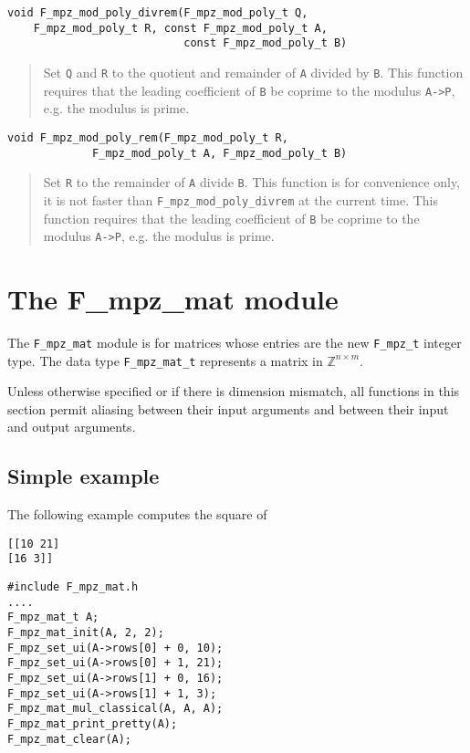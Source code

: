\documentclass[a4paper,10pt]{article}
\newcommand{\Z}{\mathbb{Z}}
\newcommand{\code}{\lstinline}
\begin{document}
\begin{lstlisting}
void F_mpz_mod_poly_divrem(F_mpz_mod_poly_t Q, 
    F_mpz_mod_poly_t R, const F_mpz_mod_poly_t A, 
                           const F_mpz_mod_poly_t B)
\end{lstlisting}
\begin{quote}
Set \code{Q} and \code{R} to the quotient and remainder of \code{A} divided by \code{B}. This function 
requires that the leading coefficient of \code{B} be coprime to the modulus \code{A->P}, e.g. the
modulus is prime. 
\end{quote}

\begin{lstlisting}
void F_mpz_mod_poly_rem(F_mpz_mod_poly_t R, 
             F_mpz_mod_poly_t A, F_mpz_mod_poly_t B)
\end{lstlisting}
\begin{quote}
Set \code{R} to the remainder of \code{A} divide \code{B}. This function is for convenience only, it is
not faster than \code{F_mpz_mod_poly_divrem} at the current time. This function requires that the leading 
coefficient of \code{B} be coprime to the modulus \code{A->P}, e.g. the modulus is prime. 
\end{quote}

\section{The F\_mpz\_mat module}

The \code{F_mpz_mat} module is for matrices whose entries are the new \code{F_mpz_t} integer type.  The data type 
\code{F_mpz_mat_t} represents a matrix in $\Z^{n \times m}$.    

Unless otherwise specified or if there is dimension mismatch, all functions in this section permit aliasing between their input arguments and between their input and output arguments. 

\subsection{Simple example}

The following example computes the square of 
\begin{lstlisting}
[[10 21]
[16 3]]
\end{lstlisting} 

\begin{lstlisting}
#include F_mpz_mat.h
....
F_mpz_mat_t A;
F_mpz_mat_init(A, 2, 2);
F_mpz_set_ui(A->rows[0] + 0, 10);
F_mpz_set_ui(A->rows[0] + 1, 21);
F_mpz_set_ui(A->rows[1] + 0, 16);
F_mpz_set_ui(A->rows[1] + 1, 3);
F_mpz_mat_mul_classical(A, A, A);
F_mpz_mat_print_pretty(A);
F_mpz_mat_clear(A);
\end{lstlisting}
\end{document}
